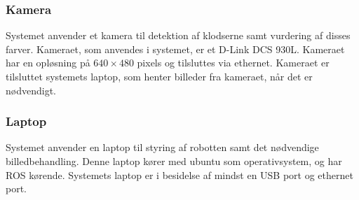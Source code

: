 \subsubsection{Kamera} %
\label{subsub:camera}

Systemet anvender et kamera til detektion af klodserne samt vurdering af disses farver. Kameraet, som anvendes i systemet, er et D-Link DCS 930L. Kameraet har en opløsning på $640 \times 480$ pixels og tilsluttes via ethernet. Kameraet er tilsluttet systemets laptop, som henter billeder fra kameraet, når det er nødvendigt.


\subsubsection{Laptop} %
\label{subsub:laptop}

Systemet anvender en laptop til styring af robotten samt det nødvendige billedbehandling. Denne laptop kører med ubuntu som operativsystem, og har ROS kørende. Systemets laptop er i besidelse af mindst en USB port og ethernet port.


